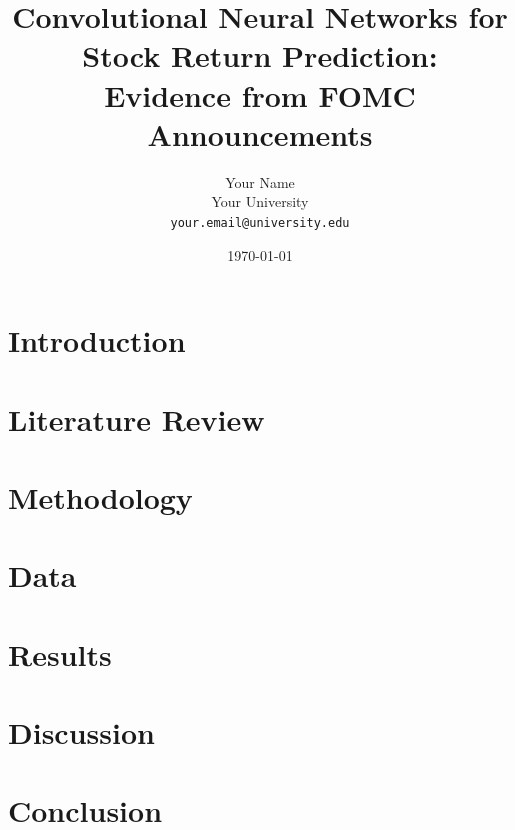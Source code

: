 \documentclass[12pt,letterpaper]{article}
\title{Convolutional Neural Networks for Stock Return Prediction:\\
       Evidence from FOMC Announcements}
\author{Your Name\\
        Your University\\
        \texttt{your.email@university.edu}}
\date{\today}
\begin{document}
\maketitle
\thispagestyle{empty}
\newpage

\begin{abstract}

\end{abstract}

\newpage

\tableofcontents
\newpage

\listoffigures
\newpage

\listoftables
\newpage


\section{Introduction}


\section{Literature Review}


\section{Methodology}


\section{Data}


\section{Results}


\section{Discussion}


\section{Conclusion}

\end{document}

